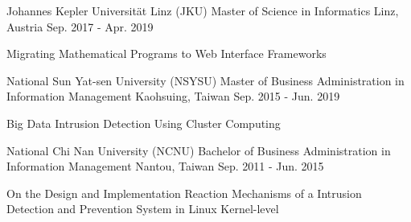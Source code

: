 


\begin{cventries}


\cventry
{Johannes Kepler Universität Linz (JKU)} %
{Master of Science in Informatics} %
{Linz, Austria} %
{Sep. 2017 - Apr. 2019} %
{ %
\begin{cvitems}
\item {Migrating Mathematical Programs to Web Interface Frameworks}
\end{cvitems}
}



\cventry
{National Sun Yat-sen University (NSYSU)} %
{Master of Business Administration in Information Management} %
{Kaohsuing, Taiwan} %
{Sep. 2015 - Jun. 2019} %
{ %
\begin{cvitems}
\item {Big Data Intrusion Detection Using Cluster Computing}
\end{cvitems}
}



\cventry
{National Chi Nan University (NCNU)} %
{Bachelor of Business Administration in Information Management} %
{Nantou, Taiwan} %
{Sep. 2011 - Jun. 2015} %
{ %
\begin{cvitems}
\item {On the Design and Implementation Reaction Mechanisms of a Intrusion Detection and Prevention System in Linux Kernel-level}
\end{cvitems}
}


\end{cventries}